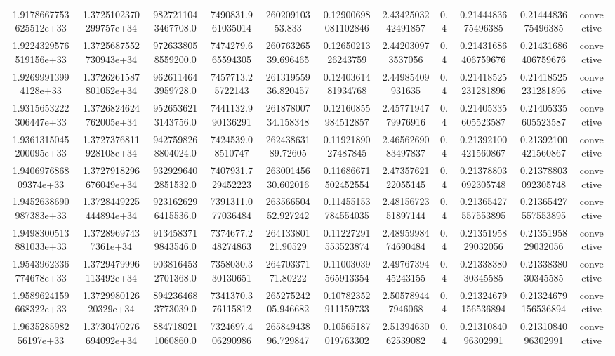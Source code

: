 \begin{table}
\begin{tabular}{ccccccccccc}
1.9178667753625512e+33 & 1.3725102370299757e+34 & 9827211043467708.0 & 7490831.961035014 & 26020910353.833 & 0.12900698081102846 & 2.4342503242491857 & 0.4 & 0.2144483675496385 & 0.2144483675496385 & convective \\
1.9224329576519156e+33 & 1.3725687552730943e+34 & 9726338058559200.0 & 7474279.665594305 & 26076326539.696465 & 0.1265021326243759 & 2.442030973537056 & 0.4 & 0.21431686406759676 & 0.21431686406759676 & convective \\
1.92699913994128e+33 & 1.3726261587801052e+34 & 9626114643959728.0 & 7457713.25722143 & 26131955936.820457 & 0.1240361481934768 & 2.44985409931635 & 0.4 & 0.21418525231281896 & 0.21418525231281896 & convective \\
1.9315653222306447e+33 & 1.3726824624762005e+34 & 9526536213143756.0 & 7441132.990136291 & 26187800734.158348 & 0.12160855984512857 & 2.4577194779976916 & 0.4 & 0.21405335605523587 & 0.21405335605523587 & convective \\
1.9361315045200095e+33 & 1.3727376811928108e+34 & 9427598268804024.0 & 7424539.08510747 & 26243863189.72605 & 0.1192189027487845 & 2.4656269083497837 & 0.4 & 0.21392100421560867 & 0.21392100421560867 & convective \\
1.940697686809374e+33 & 1.3727918296676049e+34 & 9329296402851532.0 & 7407931.729452223 & 26300145630.602016 & 0.11686671502452554 & 2.4735762122055145 & 0.4 & 0.21378803092305748 & 0.21378803092305748 & convective \\
1.9452638690987383e+33 & 1.3728449225444894e+34 & 9231626296415536.0 & 7391311.077036484 & 26356650452.927242 & 0.11455153784554035 & 2.4815672351897144 & 0.4 & 0.21365427557553895 & 0.21365427557553895 & convective \\
1.9498300513881033e+33 & 1.37289697437361e+34 & 9134583719843546.0 & 7374677.248274863 & 26413380121.90529 & 0.11227291553523874 & 2.4895998474690484 & 0.4 & 0.2135195829032056 & 0.2135195829032056 & convective \\
1.9543962336774678e+33 & 1.3729479996113492e+34 & 9038164532701368.0 & 7358030.330130651 & 26470337171.80222 & 0.11003039565913354 & 2.4976739445243155 & 0.4 & 0.2133838030345585 & 0.2133838030345585 & convective \\
1.9589624159668322e+33 & 1.372998012620329e+34 & 8942364683773039.0 & 7341370.376115812 & 26527524205.946682 & 0.10782352911159733 & 2.505789447946068 & 0.4 & 0.21324679156536894 & 0.21324679156536894 & convective \\
1.963528598256197e+33 & 1.3730470276694092e+34 & 8847180211060860.0 & 7324697.406290986 & 26584943896.729847 & 0.10565187019763302 & 2.5139463062539082 & 0.4 & 0.2131084096302991 & 0.2131084096302991 & convective \\

\end{tabular}
\end{table}
